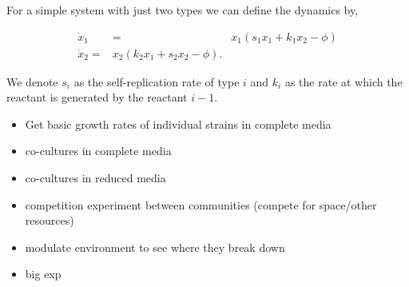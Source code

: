 For a simple system with just two types we can define the dynamics by,

\begin{align}
	\dot{x}_1 &=&  x_1 (s_1 x_1 + k_1 x_2 - \phi) \nonumber \\
	\dot{x}_2 =&  x_2 (k_2 x_1 + s_2 x_2 - \phi).
\end{align}

We denote $s_i$ as the self-replication rate of type $i$ and $k_i$ as the rate at which the reactant is generated by the reactant $i-1$.

\begin{itemize}
	\item Get basic growth rates of individual strains in complete media
	\item co-cultures in complete media
	\item co-cultures in reduced media
	\item competition experiment between communities (compete for space/other resources)
	\item modulate environment to see where they break down
	\item big exp
\end{itemize}